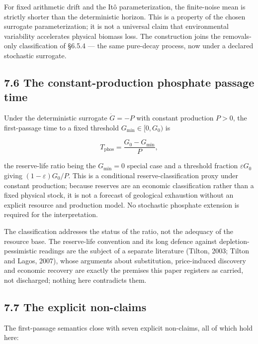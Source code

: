 \documentclass[11pt]{article}
\begin{document}
For fixed arithmetic drift and the It\^{o} parameterization, the finite-noise mean is strictly shorter than the deterministic horizon. This is a property of the chosen surrogate parameterization; it is not a universal claim that environmental variability accelerates physical biomass loss. The construction joins the removals-only classification of \S6.5.4 --- the same pure-decay process, now under a declared stochastic surrogate.

\subsection*{7.6 The constant-production phosphate passage time}\label{76-the-constant-production-phosphate-passage-time}

Under the deterministic surrogate \(\dot G = -P\) with constant production \(P > 0\), the first-passage time to a fixed threshold \(G_{\min} \in [0, G_0)\) is 

$$T_{\mathrm{phos}} = \frac{G_0 - G_{\min}}{P},$$

 the reserve-life ratio being the \(G_{\min} = 0\) special case and a threshold fraction \(\varepsilon G_0\) giving \((1-\varepsilon)G_0/\allowbreak{}P\). This is a conditional reserve-classification proxy under constant production; because reserves are an economic classification rather than a fixed physical stock, it is not a forecast of geological exhaustion without an explicit resource and production model. No stochastic phosphate extension is required for the interpretation.

The classification addresses the status of the ratio, not the adequacy of the resource base. The reserve-life convention and its long defence against depletion-pessimistic readings are the subject of a separate literature (Tilton, 2003; Tilton and Lagos, 2007), whose arguments about substitution, price-induced discovery and economic recovery are exactly the premises this paper registers as carried, not discharged; nothing here contradicts them.

\subsection*{7.7 The explicit non-claims}\label{77-the-explicit-non-claims}

The first-passage semantics close with seven explicit non-claims, all of which hold here:
\end{document}
